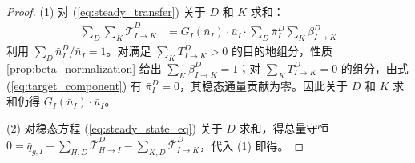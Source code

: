 \documentclass[a4paper,12pt]{article}
\theoremstyle{plain}
\theoremstyle{definition}
\theoremstyle{remark}
\begin{document}
\begin{proof}
(1) 对 (\ref{eq:steady_transfer}) 关于 $D$ 和 $K$ 求和：
\begin{equation}
\begin{aligned}
    \sum_{D} \sum_{K} \bar{\mathcal{T}}_{I \to K}^D &= G_I(\bar{n}_I) \cdot \bar{u}_I \cdot \sum_{D} \bar\pi_I^D \sum_{K} \beta_{I \to K}^D
\end{aligned}
\end{equation}
利用 $\sum_D \bar{n}_I^D / \bar{n}_I = 1$。对满足 $\sum_K T_{I\to K}^D>0$ 的目的地组分，性质 \ref{prop:beta_normalization} 给出 $\sum_K \beta_{I \to K}^D = 1$；对 $\sum_K T_{I\to K}^D=0$ 的组分，由式 (\ref{eq:target_component}) 有 $\bar\pi_I^D=0$，其稳态通量贡献为零。因此关于 $D$ 和 $K$ 求和仍得 $G_I(\bar{n}_I) \cdot \bar{u}_I$。

(2) 对稳态方程 (\ref{eq:steady_state_eq}) 关于 $D$ 求和，得总量守恒 $0 = \bar{q}_{g,I} + \sum_{H,D} \bar{\mathcal{T}}_{H \to I}^D - \sum_{K,D} \bar{\mathcal{T}}_{I \to K}^D$，代入 (1) 即得。


\end{proof}
\end{document}

